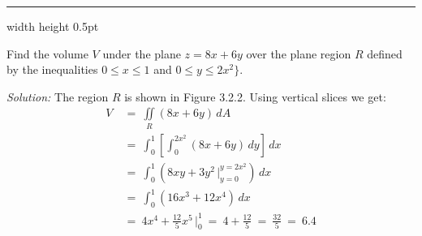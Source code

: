 \medskip
\hrule width \textwidth height 0.5pt
\begin{exmp}\label{exmp:volplanenr}
 Find the volume $V$ under the plane $z=8x+6y$ over the plane region 
 $R$ defined by the inequalities $ 0 \le x \le 1$ and  $0 \le y \le 2x^2
 \rbrace$.
 \smallskip
 \piccaption[]{}
 \par\noindent \emph{Solution:} The region $R$ is shown in Figure 3.2.2. Using vertical slices we get:
 \begin{align*}
  V ~&=~ \iint\limits_{R} (8x+6y)\,dA\\
   &=~ \int_0^1 \left[ \int_{0}^{2x^2} (8x+6y)\,dy \right] \,dx\\
   &=~ \int_0^1 \left( 8xy + 3y^2 \,\Big|_{y=0}^{y=2x^2} \right) \,dx\\
   &=~ \int_0^1 ( 16x^3 + 12x^4 )\,dx\\
   &=~ 4x^4 + \tfrac{12}{5}x^5 \,\Big|_0^1 ~=~ 4 + \tfrac{12}{5} ~=~ \tfrac{32}{5} ~=~ 6.4
 \end{align*}


\end{exmp}
